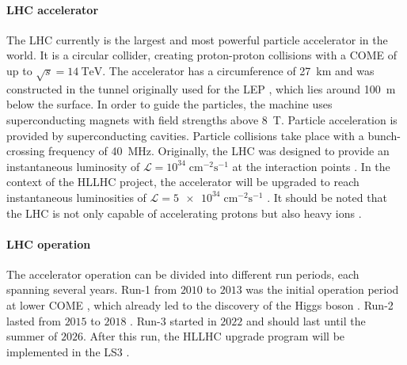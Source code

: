 \paragraph{LHC accelerator}
The \ac{LHC} currently is the largest and most powerful particle accelerator in the world. It is a circular collider, creating proton-proton collisions with a \ac{COME} of up to $\sqrt{s}=\SI{14}{\tera\electronvolt}$. The accelerator has a circumference of \SI{27}{\kilo\meter} and was constructed in the tunnel originally used for the \ac{LEP} \cite{LEP-Main}, which lies around \SI{100}{\meter} below the surface. In order to guide the particles, the machine uses superconducting magnets with field strengths above \SI{8}{\tesla}. Particle acceleration is provided by superconducting cavities. Particle collisions take place with a bunch-crossing frequency of \SI{40}{\mega\hertz}. Originally, the \ac{LHC} was designed to provide an instantaneous luminosity of $\mathcal{L}=10^{34}\;\si{\centi\meter^{-2} \second^{-1}}$ at the interaction points \cite{LHC-Main}. In the context of the \ac{HLLHC} project, the accelerator will be upgraded to reach instantaneous luminosities of $\mathcal{L}=\num{5e34}\;\si{\centi\meter^{-2} \second^{-1}}$ \cite{HLLHC-TDR}. It should be noted that the \ac{LHC} is not only capable of accelerating protons but also heavy ions \cite{LHC-Main}.
\paragraph{LHC operation}
The accelerator operation can be divided into different run periods, each spanning several years. Run-1 from $2010$ to $2013$ was the initial operation period at lower \ac{COME} \cite{LHC-Run1}, which already led to the discovery of the Higgs boson \cite{HiggsDiscovery-CMS,HiggsDiscovery-ATLAS}. Run-2 lasted from $2015$ to $2018$ \cite{LHC-Run2}. Run-3 started in $2022$ and should last until the summer of $2026$. After this run, the \ac{HLLHC} upgrade program will be implemented in the \ac{LS3} \cite{LHC-Run3}.

